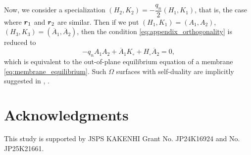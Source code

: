 \documentclass[a4paper]{amsart}
\def\br{\mbox{\boldmath $r$}}
\theoremstyle{definition}
\begin{document}
Now, we consider a specialization $(H_2, K_2) = - \dfrac{q_n}{2} (H_1, K_1)$, that is, the case where $\br_1$ and $\br_2$ are similar.
Then if we put $(H_1, K_1) = (A_1, A_2)$, $(H_3, K_3) = (\overline{A}_1, \overline{A}_2)$, then the condition \eqref{eq:appendix_orthogonality} is reduced to
\begin{equation}
-q_n A_1A_2 + \overline{A}_1 K_\circ + H_\circ \overline{A}_2= 0,
\end{equation}
which is equivalent to the out-of-plane equilibrium equation of a membrane \eqref{eq:membrane_equilibrium}.
Such $\Omega$ surfaces with self-duality are implicitly suggested in \cite{DLWS}, \cite{dKoenigs}.

\section*{Acknowledgments}
This study is supported by JSPS KAKENHI Grant No. JP24K16924 and No. JP25K21661.



\end{document}
